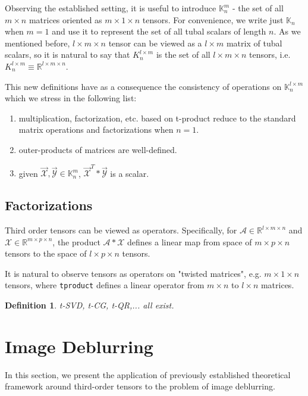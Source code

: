 \documentclass[twoside]{article}
\newtheorem{defn}{Definition}
\newcommand{\code}[1]{\texttt{#1}}
\begin{document}
\begin{multicols}{2}
\noindent Observing the established setting, it is useful to introduce $\mathbb{K}^m_n$ - the set of all $m \times n$ matrices oriented as $m \times 1 \times n$ tensors. For convenience, we write just $\mathbb{K}_n$ when $m=1$ and use it to represent the set of all tubal scalars of length $n$. As we mentioned before, $l \times m \times n$ tensor can be viewed as a $l \times m$ matrix of tubal scalars, so it is natural to say that $K^{l \times m}_n$ is the set of all $l \times m \times n$ tensors, i.e. $K^{l \times m}_n \equiv \mathbb{R}^{l \times m \times n}$.

This new definitions have as a consequence the consistency of operations on $\mathbb{K}^{l \times m}_n$ which we stress in the following list:
\begin{enumerate}
	\item multiplication, factorization, etc. based on t-product reduce to the standard matrix operations and factorizations when $n=1$.
	\item outer-products of matrices are well-defined.
	\item given $\overrightarrow{\mathcal{X}}, \overrightarrow{\mathcal{Y}} \in \mathbb{K}^m_n$, $\overrightarrow{\mathcal{X}}^T \ast \overrightarrow{\mathcal{Y}}$ is a scalar.
\end{enumerate}

\subsection{Factorizations}
Third order tensors can be viewed as operators. Specifically, for $\mathcal{A} \in \mathbb{R}^{l \times m \times n}$ and $\mathcal{X} \in \mathbb{R}^{m \times p \times n}$, the product $\mathcal{A} \ast \mathcal{X}$ defines a linear map from space of $m \times p \times n$ tensors to the space of $l \times p \times n$ tensors.

It is natural to observe tensors as operators on "twisted matrices", e.g. $m \times 1 \times n$ tensors, where \code{tproduct} defines a linear operator from $m \times n$ to $l \times n$ matrices.

\begin{defn} t-SVD, t-CG, t-QR,... all exist.
\end{defn}


\section{Image Deblurring}
In this section, we present the application of previously established theoretical framework around third-order tensors to the problem of image deblurring.\\


\end{multicols}
\end{document}
